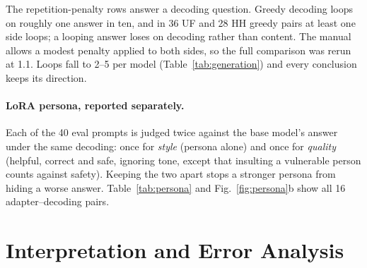 \documentclass{article}
\begin{document}
The repetition-penalty rows answer a decoding question. Greedy decoding loops on roughly one answer in ten, and in 36
UF and 28 HH greedy pairs at least one side loops; a looping answer loses on decoding rather than content. The manual
allows a modest penalty applied to both sides, so the full comparison was rerun at 1.1. Loops fall to 2--5 per model
(Table~\ref{tab:generation}) and every conclusion keeps its direction.



\paragraph{LoRA persona, reported separately.} Each of the 40 eval prompts is judged twice against the base model's
answer under the same decoding: once for \emph{style} (persona alone) and once for \emph{quality} (helpful, correct and
safe, ignoring tone, except that insulting a vulnerable person counts against safety). Keeping the two apart stops a
stronger persona from hiding a worse answer. Table~\ref{tab:persona} and Fig.~\ref{fig:persona}b show all 16
adapter--decoding pairs.



\section{Interpretation and Error Analysis}
\label{sec:analysis}


\end{document}
